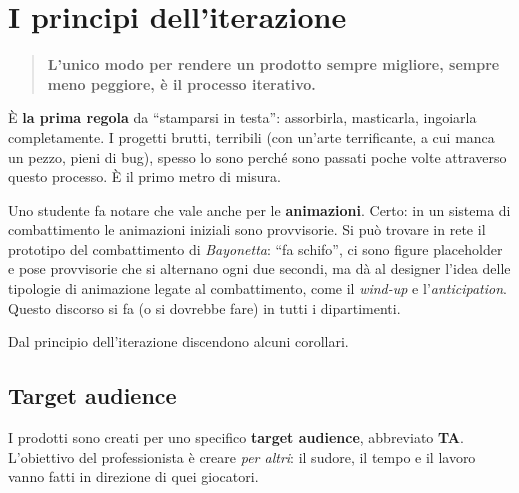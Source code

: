 \section{I principi dell'iterazione}
\label{sec:principi-iterazione}



\begin{quote}
\centering
\textbf{L'unico modo per rendere un prodotto sempre migliore, sempre meno
peggiore, è il processo iterativo.}
\end{quote}

È \textbf{la prima regola} da ``stamparsi in testa'': assorbirla, masticarla,
ingoiarla completamente. I progetti brutti, terribili (con un'arte
terrificante, a cui manca un pezzo, pieni di bug), spesso lo sono perché sono
passati poche volte attraverso questo processo. È il primo metro di misura.

Uno studente fa notare che vale anche per le \textbf{animazioni}. Certo: in
un sistema di combattimento le animazioni iniziali sono provvisorie. Si può
trovare in rete il prototipo del combattimento di \emph{Bayonetta}: ``fa
schifo'', ci sono figure placeholder e pose provvisorie che si alternano ogni
due secondi, ma dà al designer l'idea delle tipologie di animazione legate al
combattimento, come il \emph{wind-up} e l'\emph{anticipation}. Questo
discorso si fa (o si dovrebbe fare) in tutti i dipartimenti.

Dal principio dell'iterazione discendono alcuni corollari.

\subsection{Target audience}

I prodotti sono creati per uno specifico \textbf{target audience}, abbreviato
\textbf{TA}. L'obiettivo del professionista è creare \emph{per altri}: il
sudore, il tempo e il lavoro vanno fatti in direzione di quei giocatori.

